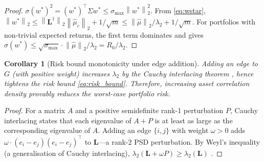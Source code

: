 \documentclass[twocolumn,11pt,a4paper]{article}
\theoremstyle{plain}
\newtheorem{corollary}[theorem]{Corollary}
\theoremstyle{definition}
\theoremstyle{remark}
\newcommand{\Lop}{\mathbf{L}}        %
\newcommand{\Lpinv}{\mathbf{L}^{\dagger}} %
\newcommand{\wstar}{w^{*}}
\newcommand{\lamtwo}{\lambda_2}
\newcommand{\norm}[1]{\left\|#1\right\|}
\begin{document}
\begin{proof}
  $\sigma(\wstar)^2=(\wstar)^{\top}\Sigma\wstar\le\sigma_{\max}\norm{\wstar}_2^2$.
  From \eqref{eq:wstar}, $\norm{\wstar}_2\le\norm{\Lpinv}_2\norm{\hat\mu_c}_2+1/\sqrt{m}
  \le\norm{\hat\mu}_2/\lamtwo+1/\sqrt{m}$.  For portfolios with
  non-trivial expected returns, the first term dominates and gives
  $\sigma(\wstar)\le\sqrt{\sigma_{\max}}\cdot\norm{\hat\mu}_2/\lamtwo=R_0/\lamtwo$.
\end{proof}

\begin{corollary}[Risk bound monotonicity under edge addition]
  Adding an edge to $G$ (with positive weight) increases $\lamtwo$ by
  the Cauchy interlacing theorem \cite{HornJohnson1985,CauchyInterlacing},
  hence tightens the risk bound \eqref{eq:risk_bound}.  Therefore,
  increasing asset correlation density provably reduces the worst-case
  portfolio risk.
\end{corollary}

\begin{proof}
  For a matrix $A$ and a positive semidefinite rank-1 perturbation $P$,
  Cauchy interlacing states that each eigenvalue of $A+P$ is at least
  as large as the corresponding eigenvalue of $A$.  Adding an edge $\{i,j\}$
  with weight $\omega>0$ adds $\omega\cdot(e_i-e_j)(e_i-e_j)^{\top}$
  to $\Lop$---a rank-$2$ PSD perturbation.  By Weyl's inequality
  (a generalisation of Cauchy interlacing),
  $\lamtwo(\Lop+\omega P)\ge\lamtwo(\Lop)$ \cite{HornJohnson1985}.
\end{proof}
\end{document}
